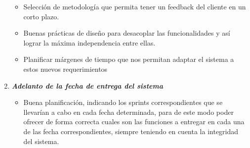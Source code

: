 \begin{enumerate}
\begin{itemize}
                \item Selección de metodología que permita tener un feedback del cliente en un corto plazo.
                \item Buenas prácticas de diseño para desacoplar las funcionalidades y así lograr la máxima independencia entre ellas.
                \item Planificar márgenes de tiempo que nos permitan adaptar el sistema a estos nuevos requerimientos
			\end{itemize}
        \item \textbf{\textit{Adelanto de la fecha de entrega del sistema}}
        	\begin{itemize}
				\item Buena planificación, indicando los sprints correspondientes que se llevarían a cabo en cada fecha determinada, para de este modo poder ofrecer de forma correcta cuales son las funciones a entregar en cada una de las fecha correspondientes, siempre teniendo en cuenta la integridad del sistema.
			\end{itemize}
	\end{enumerate}

\begin{comment}
	Gestión de riesgos
    La gestión de riesgos se lleva a cabo:
- En la elaboración de una propuesta, cuando se planifica el proyecto
- A intervalos regulares durante la vida del proyecto: por ejemplo, como   parten  de los  informes de estado del proyecto.
- Cuando hay un cambio de alcance en el proyecto Por tanto, es un proceso   iterativo y recurrente a lo largo de toda la vida del proyecto.

- Se reduce los costes del proyecto
- Se mejora la satisfacción del cliente
- Se incrementa la capacidad y probabilidades de éxito
- Facilita el desarrollo del proyecto
- Disminuye drásticamente las sorpresas en los proyectos
- Ayuda a la empresa a conseguir los objetivos de negocio y proyecto evitando
  problemas que podrían causar pérdidas inesperadas y no planificadas
  
	Plan de gestión de riesgo
- Una estrategia de gestión de riesgos
- Alcance del esfuerzo en gestión de riesgos
- Cómo se piensa llevar a cabo la identificación de riesgos
- Cómo se va a llevar a cabo el análisis de riesgos (cualitativo, cuantitativo,  
  priorización)
- Cómo se va a llevar a cabo el plan de respuesta (no debe contener los
  propios   planes de respuesta ni tratar riesgos concretos)
- Cómo se va a llevar a cabo la monitorización y control
- Presupuesto de gestión de riesgos
- Calendario de actividades de gestión de riesgos
- Roles y responsabilidades

\end{comment}

